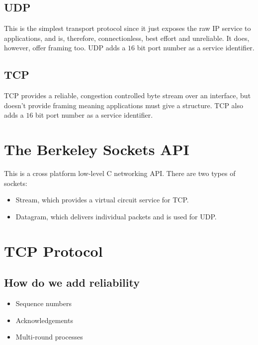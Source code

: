 \subsection{UDP}\label{sub:udp}

This is the simplest transport protocol since it just exposes the raw IP service to applications, and is, therefore, connectionless, best effort and unreliable.
It does, however, offer framing too.
UDP adds a \(16\) bit port number as a service identifier.

\subsection{TCP}\label{sub:tcp}

TCP provides a reliable, congestion controlled byte stream over an interface, but doesn't provide framing meaning applications must give a structure.
TCP also adds a \(16\) bit port number as a service identifier.

\section{The Berkeley Sockets API}\label{sec:the_berkeley_sockets_api}

This is a cross platform low-level C networking API.
There are two types of sockets:
\begin{itemize}
    \item Stream, which provides a virtual circuit service for TCP.
    \item Datagram, which delivers individual packets and is used for UDP.
\end{itemize}

\section{TCP Protocol}\label{sec:tcp}

\subsection{How do we add reliability}\label{sub:how_do_we_add_reliability}

\begin{itemize}
    \item Sequence numbers
    \item Acknowledgements
    \item Multi-round processes
\end{itemize}

